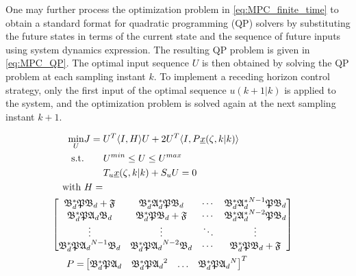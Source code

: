 One may further process the optimization problem in \eqref{eq:MPC_finite_time} to obtain a standard format for quadratic programming (QP) solvers by substituting the future states in terms of the current state and the sequence of future inputs using system dynamics expression. The resulting QP problem is given in \eqref{eq:MPC_QP}. The optimal input sequence $U$ is then obtained by solving the QP problem at each sampling instant $k$. To implement a receding horizon control strategy, only the first input of the optimal sequence $u(k+1|k)$ is applied to the system, and the optimization problem is solved again at the next sampling instant $k+1$.

\begin{equation} \label{eq:MPC_QP}
    \begin{aligned}
        \min_{U} &J = U^T \langle I,H \rangle U + 2U^T \langle I, P \underline{x}(\zeta, k|k) \rangle \\
        \text{s.t.} &\qquad U^{min} \leq U \leq U^{max} \\
        &\qquad T_u \underline{x}(\zeta, k|k) + S_u U = 0
        \, \\
        \text{with } &H = \\
        &\hspace{-3.5em }\begin{bmatrix}
            \mathfrak{B}_d^* \mathfrak{P} \mathfrak{B}_d + \mathfrak{F} & \mathfrak{B}_d^* \mathfrak{A}_d^* \mathfrak{P} \mathfrak{B}_d & \cdots &  \mathfrak{B}_d^* {\mathfrak{A}_d^*}^{N-1} \mathfrak{P} \mathfrak{B}_d \\
            \mathfrak{B}_d^* \mathfrak{P} \mathfrak{A}_d \mathfrak{B}_d & \mathfrak{B}_d^* \mathfrak{P} \mathfrak{B}_d + \mathfrak{F} & \cdots & \mathfrak{B}_d^* {\mathfrak{A}_d^*}^{N-2} \mathfrak{P} \mathfrak{B}_d \\
            \vdots & \vdots & \ddots & \vdots \\
            \mathfrak{B}_d^* \mathfrak{P} {\mathfrak{A}_d}^{N-1} \mathfrak{B}_d & \mathfrak{B}_d^* \mathfrak{P} {\mathfrak{A}_d}^{N-2} \mathfrak{B}_d & \cdots & \mathfrak{B}_d^* \mathfrak{P} \mathfrak{B}_d + \mathfrak{F}
        \end{bmatrix} \\
        P = &\begin{bmatrix}
            \mathfrak{B}_d^* \mathfrak{P} {\mathfrak{A}_d} &
            \mathfrak{B}_d^* \mathfrak{P} {\mathfrak{A}_d}^{2}  &
            \hdots &
            \mathfrak{B}_d^* \mathfrak{P} {\mathfrak{A}_d}^{N} 
        \end{bmatrix}^T \\

\end{aligned}
\end{equation}
